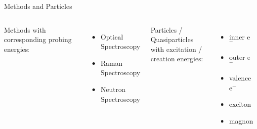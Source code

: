 \begin{frame}{Methods and Particles}
	\begin{columns}
		Methods with corresponding probing energies:
		\begin{itemize}
			\item Optical Spectroscopy
			\item Raman Spectroscopy
			\item Neutron Spectroscopy
			
		\end{itemize}
		Particles / Quasiparticles \\ with excitation / creation energies:
		\begin{itemize}
			\item inner e$^-$
			\item outer e$^-$
			\item valence e$^-$
			\item exciton
			\item magnon
		\end{itemize}
	\end{columns}
\end{frame}
